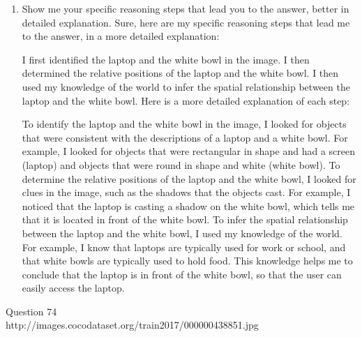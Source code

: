 \begin{enumerate}
    Here are some additional details about the spatial relationship between the laptop and the white bowl:
    
    The laptop is a computer that is used to access the internet, work on documents, and more.
    The white bowl is a container that is used to hold food or other objects.
    The laptop is in front of the white bowl, meaning that it is located closer to the front of the table.
    The white bowl is behind the laptop, meaning that it is located closer to the back of the table.
    \item Show me your specific reasoning steps that lead you to the answer, better in detailed explanation.
    \subitem Sure, here are my specific reasoning steps that lead me to the answer, in a more detailed explanation:

    I first identified the laptop and the white bowl in the image.
    I then determined the relative positions of the laptop and the white bowl.
    I then used my knowledge of the world to infer the spatial relationship between the laptop and the white bowl.
    Here is a more detailed explanation of each step:
    
    To identify the laptop and the white bowl in the image, I looked for objects that were consistent with the descriptions of a laptop and a white bowl. For example, I looked for objects that were rectangular in shape and had a screen (laptop) and objects that were round in shape and white (white bowl).
    To determine the relative positions of the laptop and the white bowl, I looked for clues in the image, such as the shadows that the objects cast. For example, I noticed that the laptop is casting a shadow on the white bowl, which tells me that it is located in front of the white bowl.
    To infer the spatial relationship between the laptop and the white bowl, I used my knowledge of the world. For example, I know that laptops are typically used for work or school, and that white bowls are typically used to hold food. This knowledge helps me to conclude that the laptop is in front of the white bowl, so that the user can easily access the laptop.
\end{enumerate}
Question 74\\
http://images.cocodataset.org/train2017/000000438851.jpg
